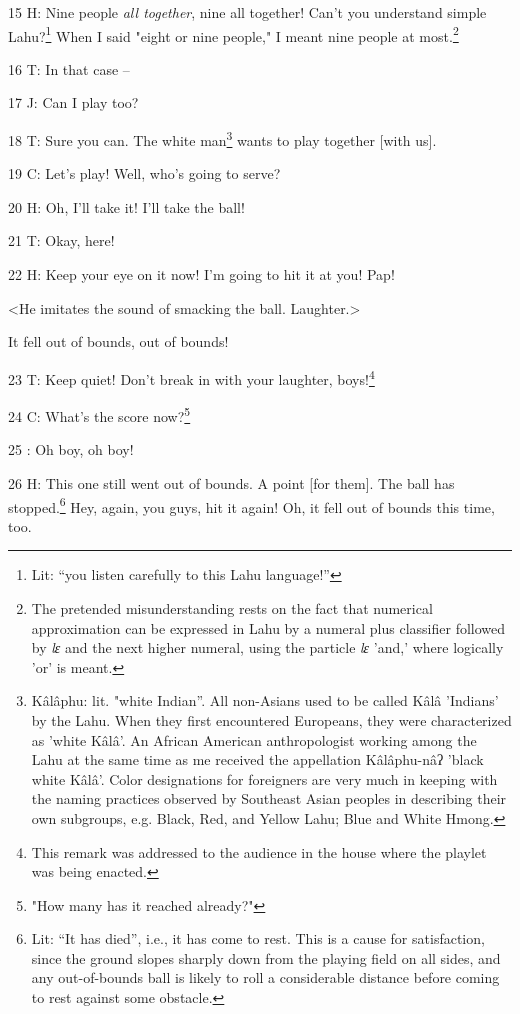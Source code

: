 15 H: Nine people \textit{all together}, nine all together! Can't you understand
simple Lahu?\footnote{Lit: ``you listen carefully to this Lahu language!''} When I said "eight or nine people," I meant
nine people at most.\footnote{The pretended misunderstanding rests on the fact that numerical approximation can be expressed in Lahu by a numeral plus classifier followed by \textit{lɛ }and the next higher numeral, using the particle \textit{lɛ} 'and,' where logically 'or' is meant.}

16 T: In that case --

17 J: Can I play too?

18 T: Sure you can. The white man\footnote{Kâlâphu: lit. "white Indian''. All non-Asians used to be called Kâlâ 'Indians' by the Lahu. When they first encountered Europeans, they were characterized as 'white Kâlâ'. An African American anthropologist working among the Lahu at the same time as me received the appellation Kâlâphu-nâʔ 'black white Kâlâ'. Color designations for foreigners are very much in keeping with the naming practices observed by Southeast Asian peoples in describing their own subgroups, e.g. Black, Red, and Yellow Lahu; Blue and White Hmong.} wants to play together [with us].

19 C: Let's play! Well, who's going to serve?

20 H: Oh, I'll take it! I'll take the ball!

21 T: Okay, here!

22 H: Keep your eye on it now! I'm going to hit it at you! Pap!

<He imitates the sound of smacking the ball. Laughter.>

It fell out of bounds, out of bounds!

23 T: Keep quiet! Don't break in with your laughter, boys!\footnote{This remark was addressed to the audience in the house where the playlet was being enacted.}

24 C: What's the score now?\footnote{"How many has it reached already?"}

25 : Oh boy, oh boy!

26 H: This one still went out of bounds. A point [for them]. The ball has stopped.\footnote{Lit: ``It has died'', i.e., it has come to rest. This is a cause for satisfaction, since the ground slopes sharply down from the playing field on all sides, and any out-of-bounds ball is likely to roll a considerable distance before coming to rest against some obstacle.}
Hey, again, you guys, hit it again! Oh, it fell out of bounds this time, too.

